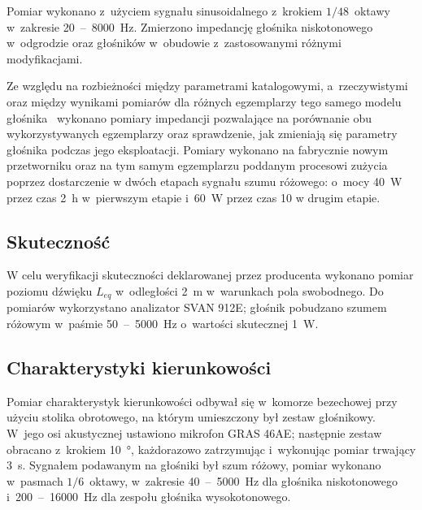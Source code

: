\documentclass[12pt]{oska}
\newcommand{\range}[2]{\num{#1}~--~\num{#2}}
\begin{document}
	
	Pomiar wykonano z~użyciem sygnału sinusoidalnego z~krokiem $1/48$~oktawy w~zakresie \range{20}{8000}~\si{\hertz}. Zmierzono impedancję głośnika niskotonowego w~odgrodzie oraz głośników w~obudowie z~zastosowanymi różnymi modyfikacjami.
	
	Ze względu na rozbieżności między parametrami katalogowymi, a~rzeczywistymi oraz między wynikami pomiarów dla różnych egzemplarzy tego samego modelu głośnika~\cite{aes_roznice} wykonano pomiary impedancji pozwalające na porównanie obu wykorzystywanych egzemplarzy oraz sprawdzenie, jak zmieniają się parametry głośnika podczas jego eksploatacji. Pomiary wykonano na fabrycznie nowym przetworniku oraz na tym samym egzemplarzu poddanym procesowi zużycia poprzez dostarczenie w dwóch etapach sygnału szumu różowego: o~mocy \SI{40}{\watt} przez czas \SI{2}{\hour} w~pierwszym etapie i~\SI{60}{\watt} przez czas \SI{10}{\min} w drugim etapie.
	
	\subsection{Skuteczność}
	
	W celu weryfikacji skuteczności deklarowanej przez producenta wykonano pomiar poziomu dźwięku $L_{eq}$ w~odległości \SI{2}{\metre} w~warunkach pola swobodnego. Do pomiarów wykorzystano analizator SVAN 912E; głośnik pobudzano szumem różowym w~paśmie \range{50}{5000}~\si{\hertz} o~wartości skutecznej \SI{1}{\watt}. 
	
	\subsection{Charakterystyki kierunkowości}
	
	
	Pomiar charakterystyk kierunkowości odbywał się w~komorze bezechowej przy użyciu stolika obrotowego, na którym umieszczony był zestaw głośnikowy. W~jego osi akustycznej ustawiono mikrofon GRAS 46AE; następnie zestaw obracano z~krokiem \SI{10}{\degree}, każdorazowo zatrzymując i~wykonując pomiar trwający \SI{3}{\s}. Sygnałem podawanym na głośniki był szum różowy, pomiar wykonano w~pasmach $1/6$~oktawy, w~zakresie \range{40}{5000}~\si{\hertz} dla głośnika niskotonowego i~\range{200}{16000}~\si{\hertz} dla zespołu głośnika wysokotonowego.
	
\end{document}
